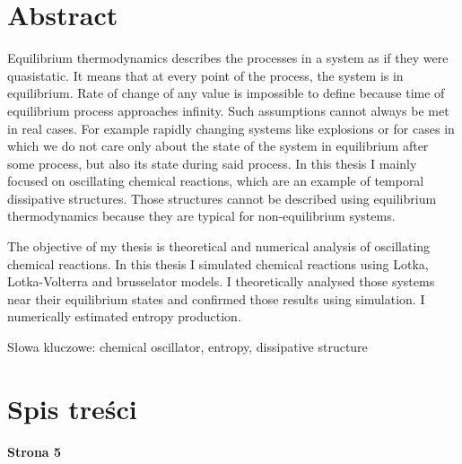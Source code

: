 \documentclass[10pt, a4paper, twoside, onecolumn]{article}
\numberwithin{equation}{section}
\begin{document}
	\pagebreak
	
	\section*{Abstract}
	Equilibrium thermodynamics describes the processes in a system as if they were quasistatic. It means that at every point of the process, the system is in equilibrium. Rate of change of any value is impossible to define because time of equilibrium process approaches infinity. Such assumptions cannot always be met in real cases. For example rapidly changing systems like explosions or for cases in which we do not care only about the state of the system in equilibrium after some process, but also its state during said process. In this thesis I mainly focused on oscillating chemical reactions, which are an example of temporal dissipative structures. Those structures cannot be described using equilibrium thermodynamics because they are typical for non-equilibrium systems. \par
	The objective of my thesis is theoretical and numerical analysis of oscillating chemical reactions. In this thesis I simulated chemical reactions using Lotka, Lotka-Volterra and brusselator models. I theoretically analysed those systems near their equilibrium states and confirmed those results using simulation. I numerically estimated entropy production. \par\noindent
	Słowa kluczowe: chemical oscillator, entropy, dissipative structure
	\pagebreak
	
	\section*{Spis treści}
	\begin{center}
		\textbf{Strona 5}
	\end{center}
	\tableofcontents
	\pagebreak
	
\end{document}
